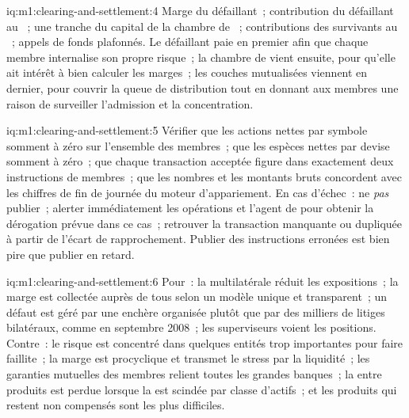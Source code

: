 \begin{solution}{iq:m1:clearing-and-settlement:4}
Marge du défaillant~; contribution du défaillant au ~; une tranche du
capital de la chambre de ~; contributions des survivants au ~;
appels de fonds plafonnés. Le défaillant paie en premier afin que chaque membre internalise
son propre risque~; la chambre de  vient ensuite, pour qu'elle ait intérêt à bien
calculer les marges~; les couches mutualisées viennent en dernier, pour couvrir la queue de distribution
tout en donnant aux membres une raison de surveiller l'admission et la concentration.
\end{solution}

\begin{solution}{iq:m1:clearing-and-settlement:5}
Vérifier que les actions nettes par symbole somment à zéro sur l'ensemble des membres~; que les espèces
nettes par devise somment à zéro~; que chaque transaction acceptée figure dans exactement deux
instructions de membres~; que les nombres et les montants bruts concordent avec les chiffres de fin de
journée du moteur d'appariement. En cas d'échec~: ne \emph{pas} publier~; alerter immédiatement
les opérations et l'agent de  pour obtenir la dérogation prévue dans
ce cas~; retrouver la transaction manquante ou dupliquée à partir de l'écart de rapprochement.
Publier des instructions erronées est bien pire que publier en retard.
\end{solution}

\begin{solution}{iq:m1:clearing-and-settlement:6}
Pour~: la  multilatérale réduit les expositions~; la marge est collectée auprès de
tous selon un modèle unique et transparent~; un défaut est géré par une enchère organisée
plutôt que par des milliers de litiges bilatéraux, comme en septembre 2008~;
les superviseurs voient les positions. Contre~: le risque est concentré dans quelques entités
trop importantes pour faire faillite~; la marge est procyclique et transmet le stress par la
liquidité~; les garanties mutuelles des membres relient toutes les grandes banques~; la 
entre produits est perdue lorsque la  est scindée par classe d'actifs~; et les produits qui
restent non compensés sont les plus difficiles.
\end{solution}
